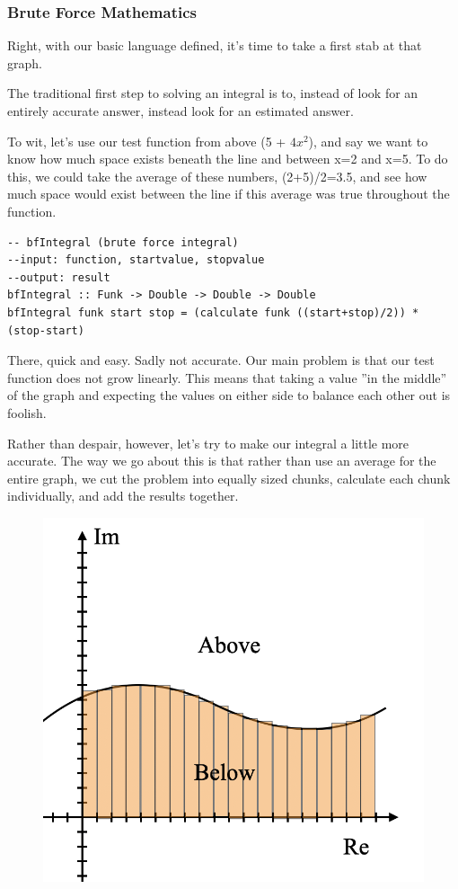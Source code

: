 \subsubsection{Brute Force Mathematics}
Right, with our basic language defined, it's time to take a first stab at that graph.

The traditional first step to solving an integral is to, instead of look for an entirely accurate answer, instead look for an estimated answer.

To wit, let's use our test function from above (5 + $4x^2$), and say we want to know how much space exists beneath the line and between x=2 and x=5. To do this, we could take the average of these numbers, (2+5)/2=3.5, and see how much space would exist between the line if this average was true throughout the function.
\begin{verbatim}
-- bfIntegral (brute force integral)
--input: function, startvalue, stopvalue
--output: result
bfIntegral :: Funk -> Double -> Double -> Double
bfIntegral funk start stop = (calculate funk ((start+stop)/2)) * (stop-start)
\end{verbatim}

There, quick and easy. Sadly not accurate. Our main problem is that our test function does not grow linearly. This means that taking a value ''in the middle'' of the graph and expecting the values on either side to balance each other out is foolish.

Rather than despair, however, let's try to make our integral a little more accurate. The way we go about this is that rather than use an average for the entire graph, we cut the problem into equally sized chunks, calculate each chunk individually, and add the results together.

\begin{figure}[h!]
    \centering
    \includegraphics[scale= 0.5]{Images/integralBruteForce.png}
    \caption{}
    \label{integralbruteforce}
\end{figure}

